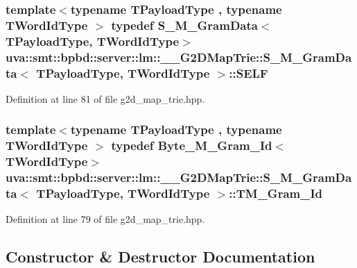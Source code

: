\subsubsection[{S\+E\+L\+F}]{\setlength{\rightskip}{0pt plus 5cm}template$<$typename T\+Payload\+Type , typename T\+Word\+Id\+Type $>$ typedef {\bf S\+\_\+\+M\+\_\+\+Gram\+Data}$<$T\+Payload\+Type, T\+Word\+Id\+Type$>$ {\bf uva\+::smt\+::bpbd\+::server\+::lm\+::\+\_\+\+\_\+\+G2\+D\+Map\+Trie\+::\+S\+\_\+\+M\+\_\+\+Gram\+Data}$<$ T\+Payload\+Type, T\+Word\+Id\+Type $>$\+::{\bf S\+E\+L\+F}}\label{structuva_1_1smt_1_1bpbd_1_1server_1_1lm_1_1_____g2_d_map_trie_1_1_s___m___gram_data_a88a54f22f9c347843a007f3617bf34dc}


Definition at line 81 of file g2d\+\_\+map\+\_\+trie.\+hpp.

\hypertarget{structuva_1_1smt_1_1bpbd_1_1server_1_1lm_1_1_____g2_d_map_trie_1_1_s___m___gram_data_aadcea57ebc508f6acf9ec6764e991c13}{}
\subsubsection[{T\+M\+\_\+\+Gram\+\_\+\+Id}]{\setlength{\rightskip}{0pt plus 5cm}template$<$typename T\+Payload\+Type , typename T\+Word\+Id\+Type $>$ typedef {\bf Byte\+\_\+\+M\+\_\+\+Gram\+\_\+\+Id}$<$T\+Word\+Id\+Type$>$ {\bf uva\+::smt\+::bpbd\+::server\+::lm\+::\+\_\+\+\_\+\+G2\+D\+Map\+Trie\+::\+S\+\_\+\+M\+\_\+\+Gram\+Data}$<$ T\+Payload\+Type, T\+Word\+Id\+Type $>$\+::{\bf T\+M\+\_\+\+Gram\+\_\+\+Id}}\label{structuva_1_1smt_1_1bpbd_1_1server_1_1lm_1_1_____g2_d_map_trie_1_1_s___m___gram_data_aadcea57ebc508f6acf9ec6764e991c13}


Definition at line 79 of file g2d\+\_\+map\+\_\+trie.\+hpp.



\subsection{Constructor \& Destructor Documentation}
\hypertarget{structuva_1_1smt_1_1bpbd_1_1server_1_1lm_1_1_____g2_d_map_trie_1_1_s___m___gram_data_a05967429ad5f775dec67bd6f17431e57}{}
